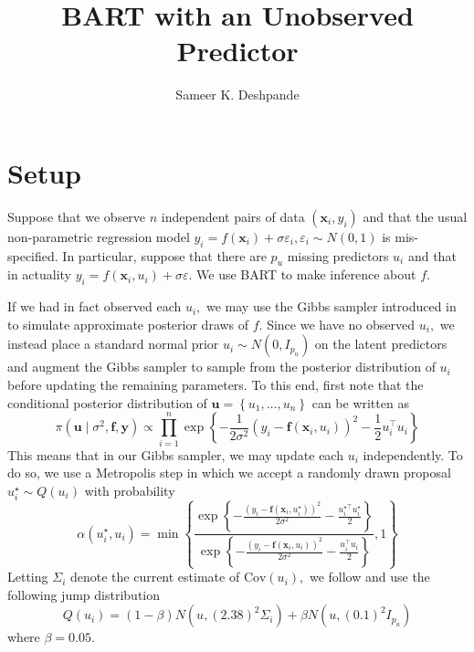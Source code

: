 \documentclass[12pt]{article}
\title{BART with an Unobserved Predictor}
\author{Sameer K. Deshpande}
\begin{document}
\maketitle
\def\C{\mathbb{C}}
\def\R{\mathbb{R}}
\def\Q{\mathbb{Q}}
\def\Z{\mathbb{Z}}
\def\N{\text{N}}
\def\P{\mathbb{P}}
\def\E{\mathbb{E}}
\def\by{\mathbf{y}}
\def\bx{\mathbf{x}}
\def\bz{\mathbf{z}}
\def\bw{\mathbf{w}}
\def\br{\mathbf{r}}
\def\bu{\mathbf{u}}
\def\bY{\mathbf{Y}}
\def\bX{\mathbf{X}}
\def\bf{\mathbf{f}}
\def\bgamma{\boldsymbol{\gamma}}
\def\bSigma{\boldsymbol{\Sigma}}
\def\bsigma{\boldsymbol{\sigma}}
\def\bmu{\boldsymbol{\mu}}

\def\bu{\boldsymbol{u}}

\def\M{\mathcal{M}}
\def\T{\mathcal{T}}
\def\tilT{\tilde{T}}

\section{Setup}
\label{sec:setup}

Suppose that we observe $n$ independent pairs of data $(\bx_{i}, y_{i})$ and that the usual non-parametric regression model $y_{i} = f(\bx_{i}) + \sigma\varepsilon_{i}, \varepsilon_{i} \sim N(0,1)$ is mis-specified.
In particular, suppose that there are $p_{u}$ missing predictors $u_{i}$ and that in actuality $y_{i} = f(\bx_{i}, u_{i}) + \sigma \varepsilon.$
We use BART \citep{Chipman2010} to make inference about $f.$

If we had in fact observed each $u_{i},$ we may use the Gibbs sampler introduced in \citep{Chipman2010} to simulate approximate posterior draws of $f.$
Since we have no observed $u_{i},$ we instead place a standard normal prior $u_{i} \sim N(0, I_{p_{u}})$ on the latent predictors and augment the Gibbs sampler to sample from the posterior distribution of $u_{i}$ before updating the remaining parameters.
To this end, first note that the conditional posterior distribution of $\bu = \left\{u_{1}, \ldots, u_{n}\right\}$ can be written as
$$
\pi(\bu \mid \sigma^{2}, \bf, \by) \propto \prod_{i = 1}^{n}{\exp\left\{-\frac{1}{2\sigma^{2}}\left(y_{i} - \bf(\bx_{i}, u_{i})\right)^{2} - \frac{1}{2}u_{i}^{\top}u_{i}\right\}}
$$
This means that in our Gibbs sampler, we may update each $u_{i}$ independently.
To do so, we use a Metropolis step in which we accept a randomly drawn proposal $u_{i}^{\star} \sim Q(u_{i})$ with probability
$$
\alpha(u_{i}^{\star}, u_{i}) = \min\left\{\frac{\exp\left\{-\frac{\left(y_{i} - \bf(\bx_{i}, u^{\star}_{i})\right)^{2}}{2\sigma^{2}} - \frac{u_{i}^{\star\top}u^{\star}_{i}}{2}\right\}}{\exp\left\{-\frac{\left(y_{i} - \bf(\bx_{i}, u_{i})\right)^{2}}{2\sigma^{2}} - \frac{u_{i}^{\top}u_{i}}{2}\right\}}, 1 \right\}
$$
Letting $\Sigma_{i}$ denote the current estimate of $\text{Cov}(u_{i}),$ we follow \citet{Roberts2009} and use the following jump distribution
$$
Q(u_{i}) = (1 - \beta) N(u, (2.38)^{2}\Sigma_{i}) + \beta N(u, (0.1)^{2}I_{p_{u}})
$$
where $\beta = 0.05.$
\end{document}
